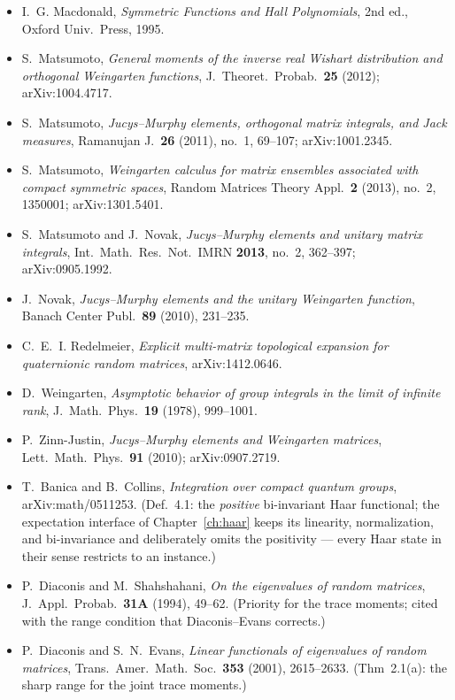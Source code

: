 \begin{itemize}
\item I.~G. Macdonald, \emph{Symmetric Functions and Hall Polynomials}, 2nd ed., Oxford Univ.\ Press, 1995.
\item S.~Matsumoto, \emph{General moments of the inverse real Wishart distribution and orthogonal Weingarten functions}, J.\ Theoret.\ Probab.\ \textbf{25} (2012); arXiv:1004.4717.
\item S.~Matsumoto, \emph{Jucys--Murphy elements, orthogonal matrix integrals, and Jack measures}, Ramanujan J.\ \textbf{26} (2011), no.~1, 69--107; arXiv:1001.2345.
\item S.~Matsumoto, \emph{Weingarten calculus for matrix ensembles associated with compact symmetric spaces}, Random Matrices Theory Appl.\ \textbf{2} (2013), no.~2, 1350001; arXiv:1301.5401.
\item S.~Matsumoto and J.~Novak, \emph{Jucys--Murphy elements and unitary matrix integrals}, Int.\ Math.\ Res.\ Not.\ IMRN \textbf{2013}, no.~2, 362--397; arXiv:0905.1992.
\item J.~Novak, \emph{Jucys--Murphy elements and the unitary Weingarten function}, Banach Center Publ.\ \textbf{89} (2010), 231--235.
\item C.~E.~I. Redelmeier, \emph{Explicit multi-matrix topological expansion for quaternionic random matrices}, arXiv:1412.0646.
\item D.~Weingarten, \emph{Asymptotic behavior of group integrals in the limit of infinite rank}, J.\ Math.\ Phys.\ \textbf{19} (1978), 999--1001.
\item P.~Zinn-Justin, \emph{Jucys--Murphy elements and Weingarten matrices}, Lett.\ Math.\ Phys.\ \textbf{91} (2010); arXiv:0907.2719.
\item T.~Banica and B.~Collins, \emph{Integration over compact quantum groups}, arXiv:math/0511253. (Def.~4.1: the \emph{positive} bi-invariant Haar functional; the expectation interface of Chapter~\ref{ch:haar} keeps its linearity, normalization, and bi-invariance and deliberately omits the positivity --- every Haar state in their sense restricts to an instance.)
\item P.~Diaconis and M.~Shahshahani, \emph{On the eigenvalues of random matrices}, J.\ Appl.\ Probab.\ \textbf{31A} (1994), 49--62. (Priority for the trace moments; cited with the range condition that Diaconis--Evans corrects.)
\item P.~Diaconis and S.~N.~Evans, \emph{Linear functionals of eigenvalues of random matrices}, Trans.\ Amer.\ Math.\ Soc.\ \textbf{353} (2001), 2615--2633. (Thm~2.1(a): the sharp range for the joint trace moments.)

\end{itemize}
